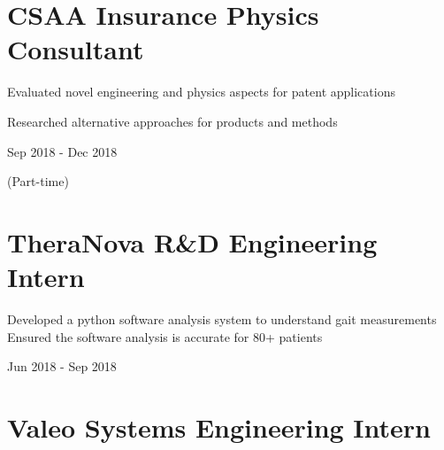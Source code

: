 \documentclass[letterpaper,10pt,oneside]{article}
\begin{document}
\begin{body}
\section
{\textbf{CSAA Insurance}
\newline
Physics Consultant 
\newline}


\vspace{-2.5ex}
\begin{detail}
\BulletItem
Evaluated novel engineering and physics aspects for patent applications

\BulletItem
Researched alternative approaches for products and methods
\end{detail}

\begin{subtitle}
\vspace{-7.8ex}
{{Sep 2018 - Dec 2018}} 
\end{subtitle}

\begin{subtitle}
\vspace{-2.0ex}
{{(Part-time)}} 
\end{subtitle}


\section
{\textbf{TheraNova}
\newline
R\&D Engineering Intern
}

\BulletItem
\vspace{-2.5ex}
\begin{detail}

\BulletItem
 Developed a python software analysis system to understand gait measurements
\BulletItem
 Ensured the software analysis is accurate for 80+ patients
\end{detail}

\begin{subtitle}
\vspace{-7.8ex}
{{Jun 2018 - Sep 2018}}
\end{subtitle}
\vspace{0ex}

\section
{\textbf{Valeo}
\newline
Systems Engineering Intern}


\end{body}
\end{document}
